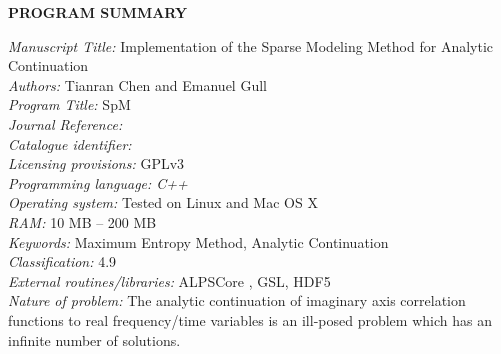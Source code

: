 \documentclass[final,5p,twocolumn,12pt]{elsarticle}
\newcounter{bla}
\begin{document}


{\bf PROGRAM SUMMARY}

\begin{small}
\noindent
{\em Manuscript Title: }   Implementation of the Sparse Modeling Method for Analytic Continuation                                    \\
{\em Authors: }                       Tianran Chen and Emanuel Gull                         \\
{\em Program Title: }      SpM                                   \\
{\em Journal Reference:}                                      \\
{\em Catalogue identifier:}                                   \\
{\em Licensing provisions:}     GPLv3                               \\
{\em Programming language: C++}                                   \\
{\em Operating system:} Tested on Linux and Mac OS X                                    \\
{\em RAM:} 10 MB -- 200 MB                                              \\
{\em Keywords:} Maximum Entropy Method, Analytic Continuation \\
{\em Classification:} 4.9 \\
{\em External routines/libraries:} ALPSCore \citep{ALPS20}\cite{ALPSCore}, GSL, HDF5 \\
{\em Nature of problem:
}The analytic continuation of imaginary axis correlation functions to real frequency/time variables is an ill-posed problem which has an infinite number of solutions. \\

\end{small}
\end{document}

